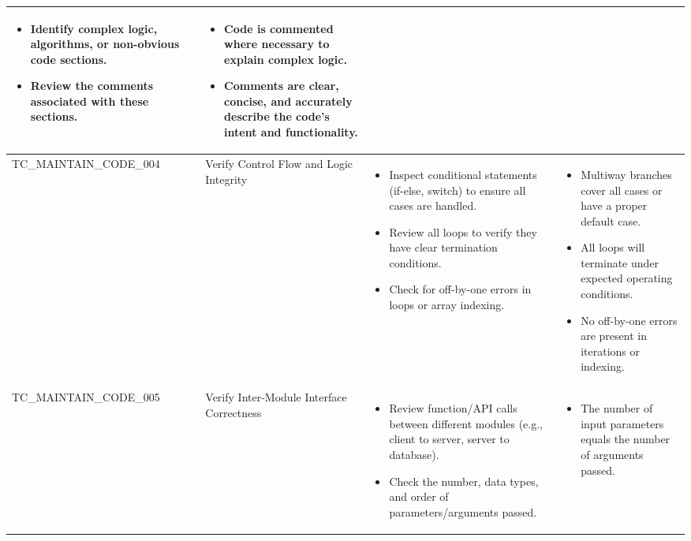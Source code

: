 \documentclass[10pt, a4paper]{report}
\begin{document}
\begin{longtable}{|>{\small\raggedright\arraybackslash}p{4cm}|>{\raggedright\arraybackslash}p{3cm}|>{\raggedright\arraybackslash}p{5cm}|>{\raggedright\arraybackslash}p{5cm}|}
\begin{itemize}[noitemsep, topsep=0pt, partopsep=0pt, leftmargin=*]
        \item Identify complex logic, algorithms, or non-obvious code sections.
        \item Review the comments associated with these sections.
    \end{itemize} & 
    \begin{itemize}[noitemsep, topsep=0pt, partopsep=0pt, leftmargin=*]
        \item Code is commented where necessary to explain complex logic.
        \item Comments are clear, concise, and accurately describe the code's intent and functionality.
    \end{itemize} \\ \hline
TC\_MAINTAIN\_CODE\_004 & Verify Control Flow and Logic Integrity & 
    \begin{itemize}[noitemsep, topsep=0pt, partopsep=0pt, leftmargin=*]
        \item Inspect conditional statements (if-else, switch) to ensure all cases are handled.
        \item Review all loops to verify they have clear termination conditions.
        \item Check for off-by-one errors in loops or array indexing.
    \end{itemize} & 
    \begin{itemize}[noitemsep, topsep=0pt, partopsep=0pt, leftmargin=*]
        \item Multiway branches cover all cases or have a proper default case.
        \item All loops will terminate under expected operating conditions.
        \item No off-by-one errors are present in iterations or indexing.
    \end{itemize} \\ \hline
TC\_MAINTAIN\_CODE\_005 & Verify Inter-Module Interface Correctness & 
    \begin{itemize}[noitemsep, topsep=0pt, partopsep=0pt, leftmargin=*]
        \item Review function/API calls between different modules (e.g., client to server, server to database).
        \item Check the number, data types, and order of parameters/arguments passed.
    \end{itemize} & 
    \begin{itemize}[noitemsep, topsep=0pt, partopsep=0pt, leftmargin=*]
        \item The number of input parameters equals the number of arguments passed.

\end{itemize}
\end{longtable}
\end{document}
